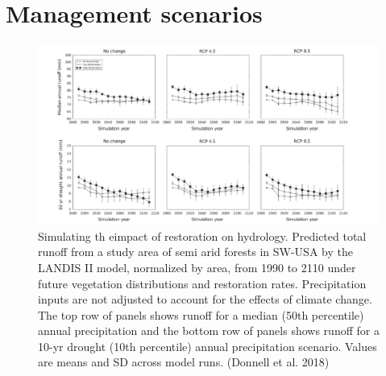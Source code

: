 \documentclass[12pt,oneside]{book}
\begin{document}
\section{Management scenarios}\label{management-scenarios}

\begin{figure}

{\centering \includegraphics[width=0.8\linewidth]{figures/chap10/f10_14_restoration} 

}

\caption{ Simulating th eimpact of restoration on hydrology. Predicted total runoff from a study area of semi arid forests in SW-USA by the LANDIS II model, normalized by area, from 1990 to 2110 under future vegetation distributions and restoration rates. Precipitation inputs are not adjusted to account for the effects of climate change. The top row of panels shows runoff for a median (50th percentile) annual precipitation and the bottom row of panels shows runoff for a 10-yr drought (10th percentile) annual precipitation scenario. Values are means and SD across model runs. (Donnell et al. 2018)}\label{fig:f1014}
\end{figure}
\end{document}
